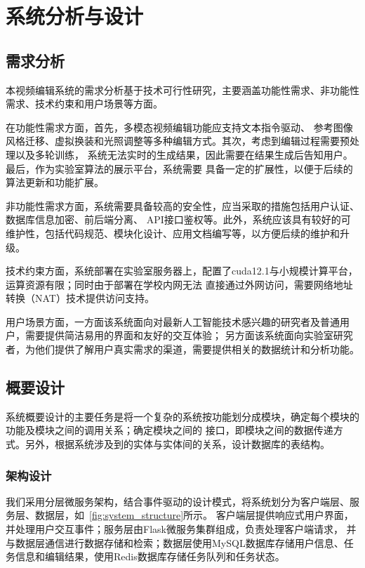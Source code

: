 \chapter{系统分析与设计}

\section{需求分析}

本视频编辑系统的需求分析基于技术可行性研究，主要涵盖功能性需求、非功能性需求、技术约束和用户场景等方面。

在功能性需求方面，首先，多模态视频编辑功能应支持文本指令驱动、
参考图像风格迁移、虚拟换装和光照调整等多种编辑方式。其次，考虑到编辑过程需要预处理以及多轮训练，
系统无法实时的生成结果，因此需要在结果生成后告知用户。最后，作为实验室算法的展示平台，系统需要
具备一定的扩展性，以便于后续的算法更新和功能扩展。

非功能性需求方面，系统需要具备较高的安全性，应当采取的措施包括用户认证、数据库信息加密、前后端分离、
API接口鉴权等。此外，系统应该具有较好的可维护性，包括代码规范、模块化设计、应用文档编写等，以方便后续的维护和升级。

技术约束方面，系统部署在实验室服务器上，配置了cuda12.1与小规模计算平台，运算资源有限；同时由于部署在学校内网无法
直接通过外网访问，需要网络地址转换（NAT）技术提供访问支持。

用户场景方面，一方面该系统面向对最新人工智能技术感兴趣的研究者及普通用户，需要提供简洁易用的界面和友好的交互体验；
另方面该系统面向实验室研究者，为他们提供了解用户真实需求的渠道，需要提供相关的数据统计和分析功能。

\section{概要设计}

系统概要设计的主要任务是将一个复杂的系统按功能划分成模块，确定每个模块的功能及模块之间的调用关系；确定模块之间的
接口，即模块之间的数据传递方式。另外，根据系统涉及到的实体与实体间的关系，设计数据库的表结构。

\subsection{架构设计}

我们采用分层微服务架构，结合事件驱动的设计模式，将系统划分为客户端层、服务层、数据层，如~\ref{fig:system_structure}所示。
客户端层提供响应式用户界面，并处理用户交互事件；服务层由Flask微服务集群组成，负责处理客户端请求，
并与数据层通信进行数据存储和检索；数据层使用MySQL数据库存储用户信息、任务信息和编辑结果，使用Redis数据库存储任务队列和任务状态。


